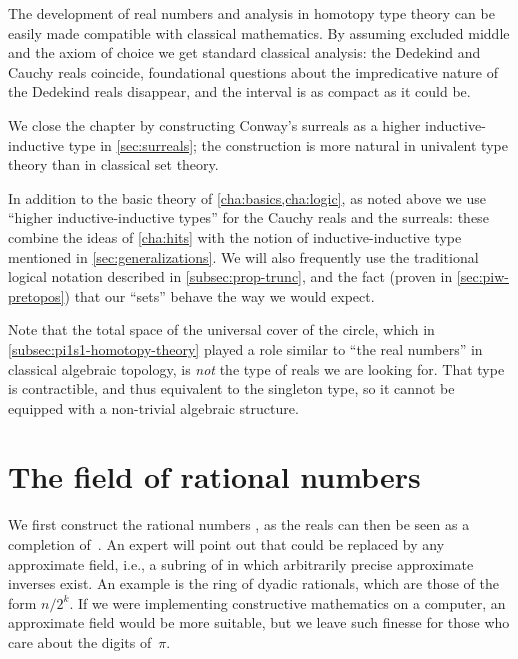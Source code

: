 The development of real numbers and analysis in homotopy type theory can be easily made compatible with classical mathematics. By assuming excluded middle and the axiom of choice we get standard classical analysis: the Dedekind and Cauchy reals coincide, foundational questions about the impredicative nature of the Dedekind reals disappear, and the interval is as compact as it could be.

We close the chapter by constructing Conway's surreals as a higher inductive-inductive type in \autoref{sec:surreals};
the construction is more natural in univalent type theory than in  classical set theory.

In addition to the basic theory of \autoref{cha:basics,cha:logic}, as noted above we use ``higher inductive-inductive types'' for the Cauchy reals and the surreals: these combine the ideas of \autoref{cha:hits} with the notion of inductive-inductive type mentioned in \autoref{sec:generalizations}.
We will also frequently use the traditional logical notation described in \autoref{subsec:prop-trunc}, and the fact (proven in \autoref{sec:piw-pretopos}) that our ``sets'' behave the way we would expect.

Note that the total space of the universal cover of the circle, which
in \autoref{subsec:pi1s1-homotopy-theory} played a role similar to ``the real numbers'' in
classical algebraic topology, is \emph{not} the type of reals we are looking for. That
type is contractible, and thus equivalent to the singleton type, so it cannot be equipped
with a non-trivial algebraic structure.



\section{The field of rational numbers}
\label{sec:field-rati-numb}

%
%
We first construct the rational numbers \Q, as the reals can then be seen as a completion
of~\Q. An expert will point out that \Q could be replaced by any approximate field,
%
i.e., a subring of \Q in which arbitrarily precise approximate inverses
%
exist. An example is the
ring of dyadic rationals,
%
which are those of the form $n/2^k$. 
If we were implementing constructive mathematics on a computer,
an approximate field would be more suitable, but we leave such finesse for those
who care about the digits of~$\pi$.

